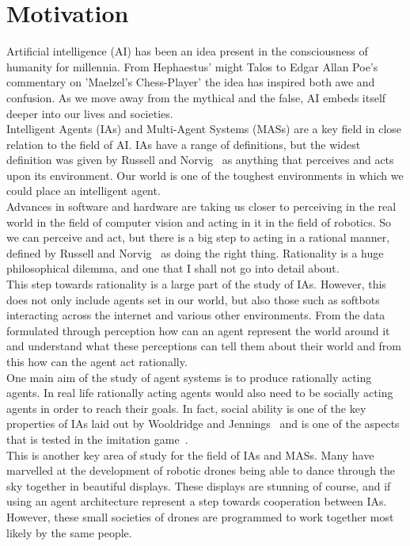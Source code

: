 \documentclass[]{final_report}
\begin{document}
\section{Motivation}
Artificial intelligence (AI) has been an idea present in the consciousness of humanity for millennia. From Hephaestus' might Talos to Edgar Allan Poe's commentary on 'Maelzel's Chess-Player' the idea has inspired both awe and confusion. As we move away from the mythical and the false, AI embeds itself deeper into our lives and societies.\\
Intelligent Agents (IAs) and Multi-Agent Systems (MASs) are a key field in close relation to the field of AI. IAs have a range of definitions, but the widest definition was given by Russell and Norvig~\cite{russell2016artificial} as anything that perceives and acts upon its environment. Our world is one of the toughest environments in which we could place an intelligent agent.\\
Advances in software and hardware are taking us closer to perceiving in the real world in the field of computer vision and acting in it in the field of robotics. So we can perceive and act, but there is a big step to acting in a rational manner, defined by Russell and Norvig~\cite{russell2016artificial} as doing the right thing. Rationality is a huge philosophical dilemma, and one that I shall not go into detail about.\\
This step towards rationality is a large part of the study of IAs. However, this does not only include agents set in our world, but also those such as softbots interacting across the internet and various other environments. From the data formulated through perception how can an agent represent the world around it and understand what these perceptions can tell them about their world and from this how can the agent act rationally.\\
One main aim of the study of agent systems is to produce rationally acting agents. In real life rationally acting agents would also need to be socially acting agents in order to reach their goals. In fact, social ability is one of the key properties of IAs laid out by Wooldridge and Jennings~\cite{wooldridge_jennings_1995} and is one of the aspects that is tested in the imitation game~\cite{machinery1950computing}.\\
This is another key area of study for the field of IAs and MASs. Many have marvelled at the development of robotic drones being able to dance through the sky together in beautiful displays. These displays are stunning of course, and if using an agent architecture represent a step towards cooperation between IAs. However, these small societies of drones are programmed to work together most likely by the same people.\\
\end{document}
